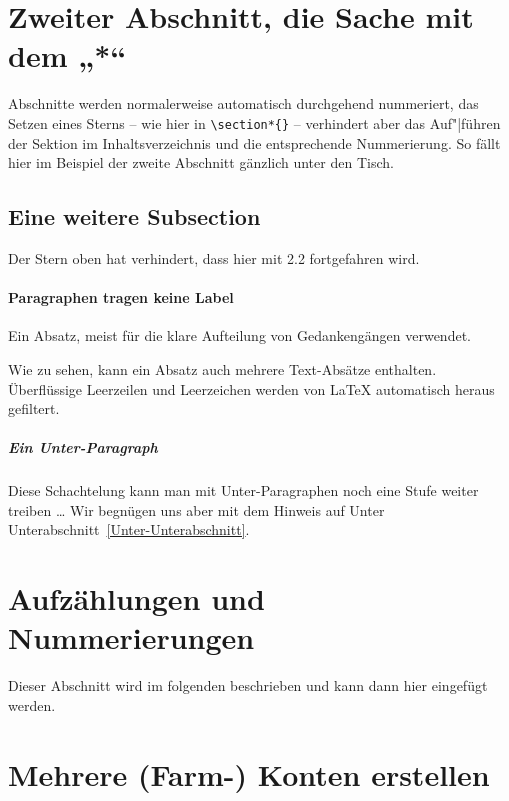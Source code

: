 \documentclass[fontsize=12pt,a4paper,draft]{scrartcl}[2003/01/01]
\begin{document}
\section*{Zweiter Abschnitt, die Sache mit dem „*“}
Abschnitte werden normalerweise automatisch durchgehend nummeriert, das Setzen eines Sterns -- wie hier in \verb|\section*{}| -- verhindert aber das Auf"|führen der Sektion im Inhaltsverzeichnis und die entsprechende
Nummerierung. So fällt hier im Beispiel der zweite Abschnitt gänzlich unter den Tisch.


\subsection[Eine Subsection]{Eine weitere Subsection}
Der Stern oben hat verhindert, dass hier mit 2.2 fortgefahren wird.

\paragraph[Label wird nicht aufgeführt]{%
  Paragraphen tragen keine Label}

Ein Absatz, meist für die klare Aufteilung von Gedankengängen verwendet.

Wie zu sehen, kann ein Absatz auch mehrere Text-Absätze enthalten. Überflüssige Leerzeilen und Leerzeichen werden von \LaTeX{} automatisch heraus gefiltert.

\subparagraph[Ein Subparagraph: Label wird nicht aufgeführt]{Ein Unter-Paragraph}

Diese Schachtelung kann man mit Unter-Paragraphen noch eine Stufe weiter treiben \ldots{}
%
Wir begnügen uns aber mit dem Hinweis auf Unter\-%
Unterabschnitt~\ref{Unter-Unterabschnitt}.

\section[Aufzählungen]{Aufzählungen und Nummerierungen}
Dieser Abschnitt wird im folgenden beschrieben und kann dann 
hier eingefügt werden.

\section{Mehrere (Farm-) Konten erstellen}
\end{document}
